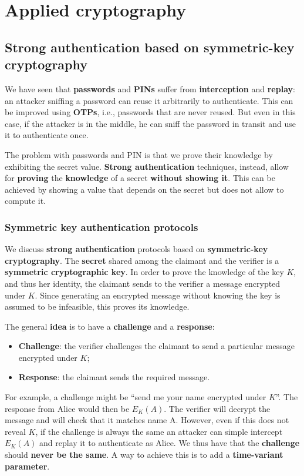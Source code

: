 \section{Applied cryptography}
\subsection{Strong authentication based on symmetric-key cryptography}
We have seen that \textbf{passwords} and \textbf{PINs} suffer from \textbf{interception} and \textbf{replay}: an attacker sniffing a password can reuse it arbitrarily to authenticate. This can be improved using \textbf{OTPs}, i.e., passwords that are never reused. But even in this case, if the attacker is in the middle, he can sniff the password in transit and use it to authenticate once.

The problem with passwords and PIN is that we prove their knowledge by exhibiting the secret value. \textbf{Strong authentication} techniques, instead, allow for \textbf{proving} the \textbf{knowledge} of a secret \textbf{without showing it}. This can be achieved by showing a value that depends on the secret but does not allow to compute it.

\subsubsection{Symmetric key authentication protocols}
We discuss \textbf{strong authentication} protocols based on \textbf{symmetric-key cryptography}. The \textbf{secret} shared among the claimant and the verifier is a \textbf{symmetric cryptographic key}. In order to prove the knowledge of the key $K$, and thus her identity, the claimant sends to the verifier a message encrypted under $K$. Since generating an encrypted message without knowing the key is assumed to be infeasible, this proves its knowledge.

The general \textbf{idea} is to have a \textbf{challenge} and a \textbf{response}:

\begin{itemize}
    \item \textbf{Challenge}: the verifier challenges the claimant to send a particular message encrypted under $K$;
    \item \textbf{Response}: the claimant sends the required message.
\end{itemize}

For example, a challenge might be “send me your name encrypted under $K$”. The response from Alice would then be $E_K(A)$. The verifier will decrypt the message and will check that it matches name A. However, even if this does not reveal $K$, if the challenge is always the same an attacker can simple intercept $E_K(A)$ and replay it to authenticate as Alice. We thus have that the \textbf{challenge} should \textbf{never be the same}. A way to achieve this is to add a \textbf{time-variant parameter}.

